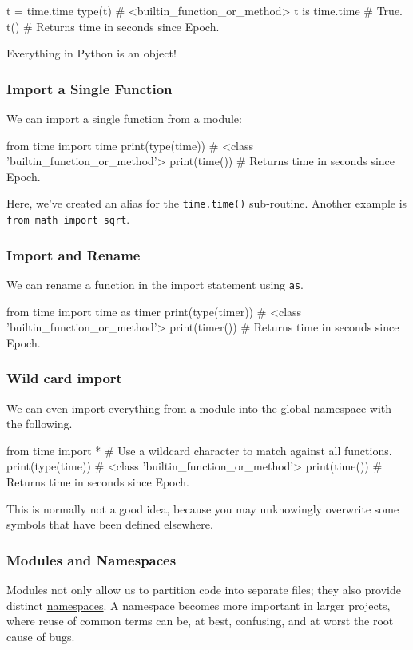 \documentclass[12pt,letterpaper,twoside]{article}
\begin{document}
\begin{enumerate}
\begin{python}
t = time.time
type(t)          # <builtin_function_or_method>
t is time.time   # True.
t()              # Returns time in seconds since Epoch.
\end{python}

Everything in Python is an object!

\subsubsection{Import a Single Function}
We can import a single function from a module:

\begin{python}
from time import time
print(type(time))   # <class 'builtin_function_or_method'>
print(time())       # Returns time in seconds since Epoch.
\end{python}

Here, we've created an alias for the \texttt{time.time()} sub-routine. 
Another example is \texttt{from\ math\ import\ sqrt}.

\subsubsection{Import and Rename}
We can rename a function in the import statement using \texttt{as}.

\begin{python}
from time import time as timer
print(type(timer))   # <class 'builtin_function_or_method'>
print(timer())       # Returns time in seconds since Epoch.
\end{python}

\subsubsection{Wild card import}
We can even import everything from a module into the global namespace with the following.

\begin{python}
from time import *    # Use a wildcard character to match against all functions.
print(type(time))     # <class 'builtin_function_or_method'>
print(time())         # Returns time in seconds since Epoch.
\end{python}

This is normally not a good idea, because you may unknowingly overwrite
some symbols that have been defined elsewhere.

\subsubsection{Modules and Namespaces}
Modules not only allow us to partition code into separate files; they also provide
distinct \href{https://en.wikipedia.org/wiki/Namespace}{namespaces}. A namespace
becomes more important in larger projects, where reuse of common terms can be, at best,
confusing, and at worst the root cause of bugs.


\end{enumerate}
\end{document}
